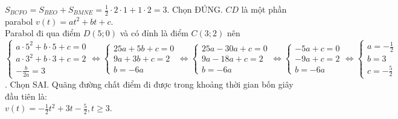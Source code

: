 \begin{ex}
{\begin{itemchoice}
\begin{center}
			\end{center}
			$\displaystyle S_{BCFO} = S_{BEO} + S_{BMNE} = \frac{1}{2} \cdot 2 \cdot 1 + 1 \cdot 2 = 3$. Chọn ĐÚNG.
			\itemch $CD$ là một phần parabol $v(t) = at^2 + bt + c$.\\
			Parabol đi qua điểm $D(5; 0)$ và có đỉnh là điểm $C(3; 2)$ nên\\
			$\begin{cases} a \cdot 5^2 + b \cdot 5 + c = 0 \\ a \cdot 3^2 + b \cdot 3 + c = 2 \\ -\frac{b}{2a} = 3 \end{cases} \Leftrightarrow \begin{cases} 25a + 5b + c = 0 \\ 9a + 3b + c = 2 \\ b = -6a \end{cases} \Leftrightarrow \begin{cases} 25a - 30a + c = 0 \\ 9a - 18a + c = 2 \\ b = -6a \end{cases} \Leftrightarrow \begin{cases} -5a + c = 0 \\ -9a + c = 2 \\ b = -6a \end{cases} \Leftrightarrow \begin{cases} a = -\frac{1}{2} \\ b = 3 \\ c = -\frac{5}{2} \end{cases}$. Chọn SAI.
			\itemch Quãng đường chất điểm đi được trong khoảng thời gian bốn giây đầu tiên là:\\
			$\displaystyle v(t) = -\frac{1}{2}t^2 + 3t - \frac{5}{2}, t \ge 3$.\\

\end{itemchoice}}
\end{ex}

